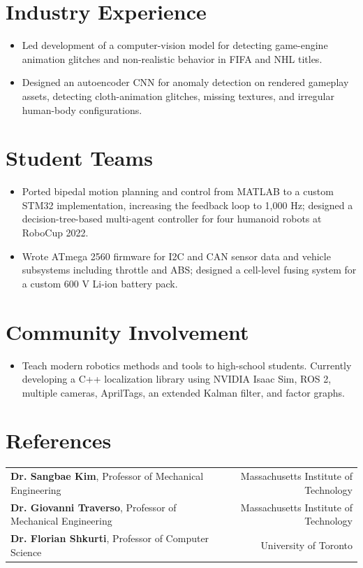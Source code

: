 \section{Industry Experience}
\begin{itemize}
  \item Led development of a computer-vision model for detecting game-engine animation glitches and non-realistic behavior in FIFA and NHL titles.
  \item Designed an autoencoder CNN for anomaly detection on rendered gameplay assets, detecting cloth-animation glitches, missing textures, and irregular human-body configurations.
\end{itemize}

\section{Student Teams}
\begin{itemize}
  \item Ported bipedal motion planning and control from MATLAB to a custom STM32 implementation, increasing the feedback loop to 1,000 Hz; designed a decision-tree-based multi-agent controller for four humanoid robots at RoboCup 2022.
\end{itemize}
\begin{itemize}
  \item Wrote ATmega 2560 firmware for I2C and CAN sensor data and vehicle subsystems including throttle and ABS; designed a cell-level fusing system for a custom 600 V Li-ion battery pack.
\end{itemize}

\section{Community Involvement}
\begin{itemize}
  \item Teach modern robotics methods and tools to high-school students. Currently developing a C++ localization library using NVIDIA Isaac Sim, ROS 2, multiple cameras, AprilTags, an extended Kalman filter, and factor graphs.
\end{itemize}

\section{References}
\begin{tabularx}{\textwidth}{@{}Xr@{}}
  \textbf{Dr. Sangbae Kim}, Professor of Mechanical Engineering & Massachusetts Institute of Technology\\
  \textbf{Dr. Giovanni Traverso}, Professor of Mechanical Engineering & Massachusetts Institute of Technology\\
  \textbf{Dr. Florian Shkurti}, Professor of Computer Science & University of Toronto
\end{tabularx}
